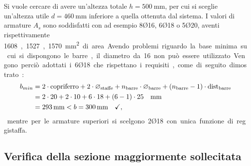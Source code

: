 Si vuole cercare di avere un'altezza totale $h = \SI{500}{\milli\metre}$, per cui si sceglie un'altezza utile $d = \SI{460}{\milli\metre}$ inferiore a quella ottenuta dal sistema. 
I valori di armature $A_s$ sono soddisfatti con ad esempio 8Ø16, 6Ø18 o 5Ø20, aventi rispettivamente \SI{1608}, \SI{1527}, \SI{1570}{\milli\metre\squared} di area.
Avendo problemi riguardo la base minima su cui si dispongono le barre, il diametro da 16 non può essere utilizzato. 
Vengono perciò adottati i 6Ø18 che rispettano i requisiti, come di seguito dimostrato:
\begin{equation}  
  \begin{split}
    b_{min} &= 2 \cdot \text{copriferro} + 2 \cdot \varnothing_\textup{staffe} + n_\textup{barre} \cdot \varnothing_\textup{barre} + \left( n_\textup{barre} - 1 \right) \cdot \text{dist}_\textup{barre}  \\
    &= 2 \cdot 20 + 2 \cdot 10 + 6 \cdot 18 + \left( 6 - 1 \right) \cdot 25 \quad \si{\milli\metre}\\
    &= \SI{293}{\milli\metre} < b = \SI{300}{\milli\metre} \quad \checkmark ,
  \end{split}
\end{equation}
mentre per le armature superiori si scelgono 2Ø18 con unica funzione di reggistaffa.

\subsection{Verifica della sezione maggiormente sollecitata}


